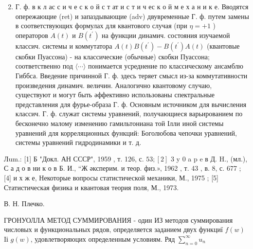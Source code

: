 \documentclass[10pt]{article}
\begin{document}
\begin{enumerate}

  \setcounter{enumi}{1}

  \item Г. ф. в к л ас с и ч е с к о й с т ат и с т и ч ес к о й м е х а н и к е. Вводятся опережающие (ret) и запаздывающие (adv) двувременные Г. ф. путем замены в соответствующих формулах для квантового случая (при $\eta=+1$ ) операторов $A(t)$ и $B\left(t^{\prime}\right)$ на функции динамич. состояния изучаемой классич. системы и коммутатора $A(t) B\left(t^{\prime}\right)-B\left(t^{\prime}\right) A(t)$ (квантовые скобки Пуассона) - на классические (обычные) скобки Пуассона; соответственно под $\langle\cdots\rangle$ понимается усреднение по классическому ансамблю Гиббса. Введение причинной Г. ф. здесь теряет смысл из-за коммутативности произведения динамич. величин. Аналогично квантовому случаю, существуют и могут быть әффективно использованы спектральные представления для фурье-образа Г. ф. Основным источником для вычисления классич. Г. ф. служат системы уравнений, получающиеся варьированием по бесконечно малому изменению гамильтониана той Ілли иной системы уравнений для корреляционных функций: Боголюбова чепочки уравнений, системы уравнений гидродинамики и т. д.

\end{enumerate}



Лum.: [1] Б "Докл. АН СССР", 1959 , т. 126, с. $53 ;[2]$ 3 y 0 a p e в Д. H., (мл.), С а д о в ни к о в Б. И., “Ж әксперим. и теор. физ.», 1962 , т. 43 , в. 8, с. 677 ; [4] и х ж е, Некоторые вопросы статистической механики, М., 1975 ; [5] Статистическая физика и квантовая теория поля, М., 1973.

В. Н. Плечко.



ГРОНУОЛЛА МЕТОД СУММИРОВАНИЯ - один ИЗ методов суммирования числовых и функциональных рядов, определяется заданием двух функциї $f(w)$ Iі $g(w)$, удовлетворяюцих определенным условиям. Ряд $\sum_{n=0}^{\infty} u_{n}$
\end{document}
